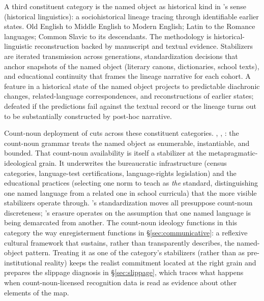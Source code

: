 \documentclass[12pt]{article}
\begin{document}
A third constituent category is the named object as historical kind in \citeauthor{millikan1999}'s sense (historical linguistics): a sociohistorical lineage tracing through identifiable earlier states. Old English to Middle English to Modern English; Latin to the Romance languages; Common Slavic to its descendants. The methodology is historical-linguistic reconstruction backed by manuscript and textual evidence. Stabilizers are iterated transmission across generations, standardization decisions that anchor snapshots of the named object (literary canons, dictionaries, school texts), and educational continuity that frames the lineage narrative for each cohort. A feature in a historical state of the named object projects to predictable diachronic changes, related-language correspondences, and reconstructions of earlier states; defeated if the predictions fail against the textual record or the lineage turns out to be substantially constructed by post-hoc narrative.

Count-noun deployment of  cuts across these constituent categories. , , : the count-noun grammar treats the named object as enumerable, instantiable, and bounded. That count-noun availability is itself a stabilizer at the metapragmatic-ideological grain. It underwrites the bureaucratic infrastructure (census categories, language-test certifications, language-rights legislation) and the educational practices (selecting one norm to teach as \emph{the} standard, distinguishing one named language from a related one in school curricula) that the more visible stabilizers operate through. \citeauthor{haugen1966}'s standardization moves all presuppose count-noun discreteness; \citeauthor{irvinegal2000}'s erasure operates on the assumption that one named language is being demarcated from another. The count-noun ideology functions in this category the way enregisterment functions in §\ref{sec:communicative}: a reflexive cultural framework that sustains, rather than transparently describes, the named-object pattern. Treating it as one of the category's stabilizers (rather than as pre-institutional reality) keeps the realist commitment located at the right grain and prepares the slippage diagnosis in §\ref{sec:slippage}, which traces what happens when count-noun-licensed recognition data is read as evidence about other elements of the map.
\end{document}
